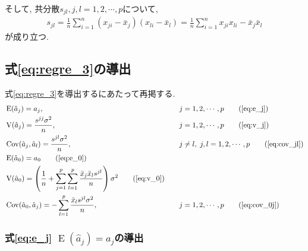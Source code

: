 そして, 共分散$s_{jl}, j, l=1, 2, \cdots, p$について, 
\begin{align}
  \label{eq:cov_jl_2}
  s_{jl} = \frac{1}{n}\sum_{i=1}^n(x_{ji}-\bar{x}_j)(x_{li}-\bar{x}_l) = \frac{1}{n}\sum_{i=1}^nx_{ji}x_{li}-\bar{x}_j\bar{x}_l
\end{align}
が成り立つ. 

\subsection{式\eqref{eq:regre_3}の導出}
\label{sec:6siki}
式\eqref{eq:regre_3}を導出するにあたって再掲する. 
\begin{alignat*}{2}
  &\operatorname{E}(\hat{a}_j) = a_j, &  &j=1, 2, \cdots, p \tag{\ref{eq:e_j}}\\
  &\operatorname{V}(\hat{a}_j) = \frac{s^{jj}\sigma^2}{n},& &j=1, 2, \cdots, p \tag{\ref{eq:v_j}}\\
  &\operatorname{Cov}(\hat{a}_j, \hat{a}_l) =\frac{s^{jl}\sigma^2}{n},& &j\neq l,\; j, l=1, 2, \cdots, p \tag{\ref{eq:cov_jl}}\\
  &\operatorname{E}(\hat{a}_0)=a_0 \tag{\ref{eq:e_0}}\\
  &\operatorname{V}(\hat{a}_0) = \left(\frac{1}{n}+\sum_{j=1}^p\sum_{l=1}^p\frac{\bar{x}_j\bar{x}_ls^{jl}}{n}\right)\sigma^2 \tag{\ref{eq:v_0}}\\
  &\operatorname{Cov}(\hat{a}_0, \hat{a}_j) = -\sum_{l=1}^p\frac{\bar{x}_ls^{jl}\sigma^2}{n},&\quad & j=1, 2, \cdots, p \tag{\ref{eq:cov_0j}}
\end{alignat*}

\subsubsection{式\eqref{eq:e_j} $\operatorname{E}(\hat{a}_j) = a_j$の導出}


